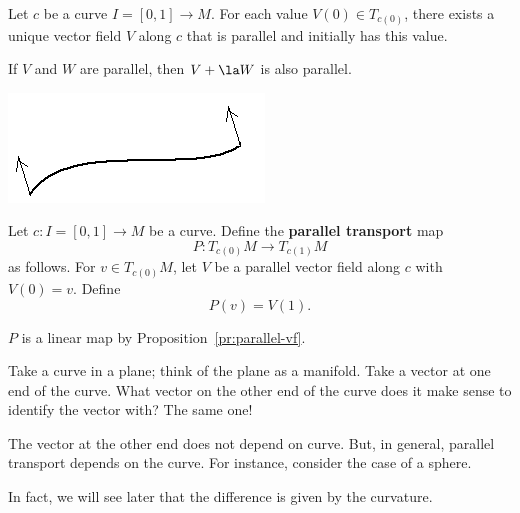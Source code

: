 \begin{pr}
Let $c$ be a curve $I=[0,1]\to M$. 
For each value $V(0)\in T_{c(0)}$, there exists a unique vector field $V$ along $c$ that is parallel and initially has this value.

If $V$ and $W$ are parallel, then $V+\la W$ is also parallel.
\end{pr}

\begin{center}
\includegraphics[scale=0.5]{4-2}
\end{center}

\begin{df}
Let $c:I=[0,1]\to M$ be a curve. Define the \textbf{parallel transport} map 
\[
P:T_{c(0)}M\to T_{c(1)}M
\]
as follows. For $v\in T_{c(0)}M$, let $V$ be a parallel vector field along $c$ with $V(0)=v$. Define
\[
P(v)=V(1).
\]
\end{df}
$P$ is a linear map by Proposition~\ref{pr:parallel-vf}.

\begin{ex}
Take a curve in a plane; think of the plane as a manifold. Take a vector at one end of the curve. What vector on the other end of the curve does it make sense to identify the vector with? The same one!

The vector at the other end does not depend on curve. But, in general, parallel transport depends on the curve. For instance, consider the case of a sphere.


In fact, we will see later that the difference is given by the curvature. 
\end{ex}

\vskip0.15in

